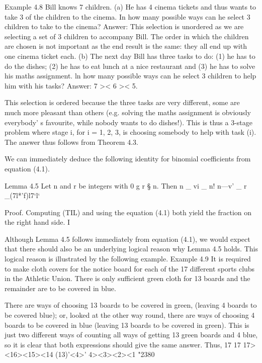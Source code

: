 \documentclass{beamer}
\begin{document}
\begin{frame}
Example 4.8 Bill knows 7 children.
(a) He has 4 cinema tickets and thus wants to take 3 of the children
to the cinema. In how many possible ways can he select 3
children to take to the cinema?
Answer: 
This selection is unordered as we are selecting a set of 3
children to accompany Bill. The order in which the children are
chosen is not important as the end result is the same: they all
end up with one cinema ticket each.
(b) The next day Bill has three tasks to do: (1) he has to do the
dishes; (2) he has to eat lunch at a nice restaurant and (3) he
has to solve his maths assignment. ln how many possible ways
can he select 3 children to help him with his tasks?
Answer: 7 >< 6 >< 5.
\end{frame}
\begin{frame}
This selection is ordered because the three tasks are very
different, some are much more pleasant than others (e.g.
solving the maths assignment is obviously everybody’ s favourite,
while nobody wants to do dishes!). This is thus a 3-stage
problem where stage i, for i = 1, 2, 3, is choosing somebody to
help with task (i). The answer thus follows from Theorem 4.3.
\end{frame}
\begin{frame}
We can immediately deduce the following identity for binomial
coefficients from equation (4.1).

Lemma 4.5 Let n and r be integers with 0 g r § n. Then
n _ vi _ n!
n—v' _ r _(7l*’f)l7‘l‘

Proof. Computing (TIL) and  using the equation (4.1) both yield
the fraction on the right hand side. I

\end{frame}
\begin{frame}
Although Lemma 4.5 follows immediately from equation (4.1), we
would expect that there should also be an underlying logical reason
why Lemma 4.5 holds. This logical reason is illustrated by the
following example.
Example 4.9 It is required to make cloth covers for the notice board
for each of the 17 different sports clubs in the Athletic Union. There
is only sufficient green cloth for 13 boards and the remainder are to
be covered in blue.
\end{frame}
\begin{frame}
There are  ways of choosing 13 boards to be covered in green,
(leaving 4 boards to be covered blue); or, looked at the other way
round, there are  ways of choosing 4 boards to be covered in blue
(leaving 13 boards to be covered in green). This is just two different
ways of counting all ways of getting 13 green boards and 4 blue, so
it is clear that both expressions should give the same answer. Thus,
17 17 17><16><15><14
(13)'<4>' 4><3><2><1 "2380
\end{frame}
\end{document}
